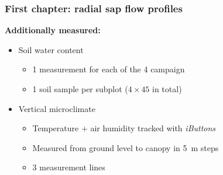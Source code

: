 \documentclass[usepdftitle=false]{beamer}
\newcommand{\Blue}[1]{{\color{blue!50!black}\textbf{#1}}}
\begin{document}
\begin{frame}
	\frametitle{First chapter: radial sap flow profiles}
  \Blue{Additionally measured:}
  \begin{itemize}
  	\item \alert{Soil water content}
  	\begin{itemize}
  		\item 1 measurement for each of the 4 campaign
  		\item 1 soil sample per subplot ($4\times45$ in total)
  	\end{itemize}
  	\item \alert{Vertical microclimate}
  	\begin{itemize}
  		\item Temperature + air humidity tracked with \textit{iButtons}
  		\item Measured from ground level to canopy in 5~m steps
  		\item 3 measurement lines
  	\end{itemize}
  \end{itemize}
\end{frame}
\end{document}

